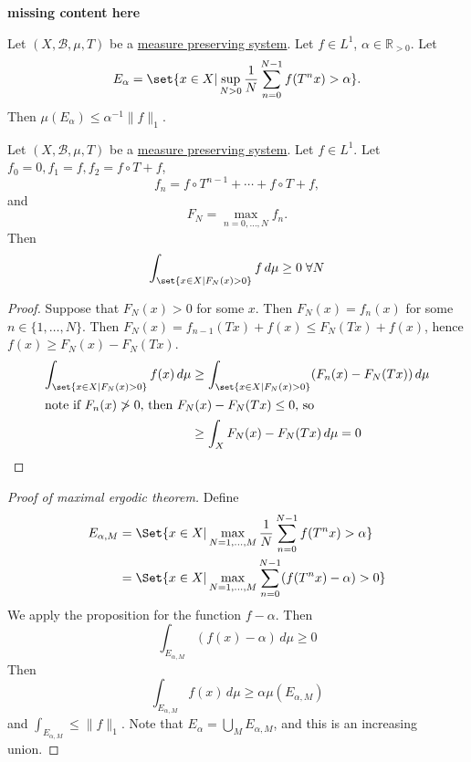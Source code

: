 \documentclass{article}
\begin{document}
\textbf{missing content here}

\begin{thm}
  Let $(X, \mathcal{B}, \mu, T)$ be a \hyperlink{def:mps}{measure preserving system}.
  Let $f \in L^1$, $\alpha \in \mathbb{R}_{> 0}$. Let
  \begin{equation*}
    E_\alpha = \set{x \in X | \sup_{N > 0} \frac{1}{N} \sum_{n=0}^{N-1} f(T^n x) > \alpha}.
  \end{equation*}
  Then $\mu(E_\alpha) \leq \alpha^{-1} \|f\|_1$.
\end{thm}
\begin{prop}
  Let $(X, \mathcal{B},\mu,T)$ be a \hyperlink{def:mps}{measure preserving system}.
  Let $f \in L^1$. Let $f_0 = 0, f_1 = f, f_2 = f \circ T + f$,
  \begin{equation*}
    f_n = f \circ T^{n-1} + \dotsb + f \circ T + f,
  \end{equation*}
  and
  \begin{equation*}
    F_N = \max_{n = 0, \dotsc, N} f_n.
  \end{equation*}
  Then
  \begin{equation*}
    \int_{\set{x \in X | F_N(x) > 0}} f \, d \mu \geq 0 \; \forall N
  \end{equation*}
\end{prop}
\begin{proof}
  Suppose that $F_N(x) > 0$ for some $x$.
  Then $F_N(x) = f_n(x)$ for some $n \in \{1, \dotsc, N\}$.
  Then $F_N(x) = f_{n-1}(Tx) + f(x) \leq F_N(Tx) + f(x)$, hence
  $f(x) \geq F_N(x) - F_N(Tx)$.
  \begin{align*}
    \int_{\set{x \in X | F_N(x) > 0}} f(x)\,d\mu &\geq \int_{\set{x \in X | F_N(x) > 0}} (F_n(x) - F_N(Tx))\,d\mu \\
    \shortintertext{note if $F_n(x) \not> 0$, then $F_N(x) - F_N(Tx) \leq 0$, so}
                                                 & \geq \int_X F_N(x) - F_N(Tx)\,d\mu = 0
  \end{align*}
\end{proof}
\begin{proof}[Proof of maximal ergodic theorem]
  Define
  \begin{align*}
    E_{\alpha,M} &= \Set{x \in X | \max_{N = 1, \dotsc, M} \frac{1}{N} \sum_{n=0}^{N-1} f(T^n x) > \alpha} \\
                 &= \Set{x \in X | \max_{N = 1, \dotsc, M} \sum_{n=0}^{N-1} (f(T^n x) - \alpha) > 0}
  \end{align*}
  We apply the proposition for the function $f - \alpha$.
  Then
  \begin{equation*}
    \int_{E_{\alpha,M}} (f(x) - \alpha)\,d\mu \geq 0
  \end{equation*}
  Then
  \begin{equation*}
    \int_{E_{\alpha,M}} f(x)\,d\mu \geq \alpha \mu(E_{\alpha,M})
  \end{equation*}
  and $\int_{E_{\alpha,M}} \leq \|f\|_1$.
  Note that $E_\alpha = \bigcup_M E_{\alpha,M}$, and this is an increasing union.
\end{proof}
\end{document}
